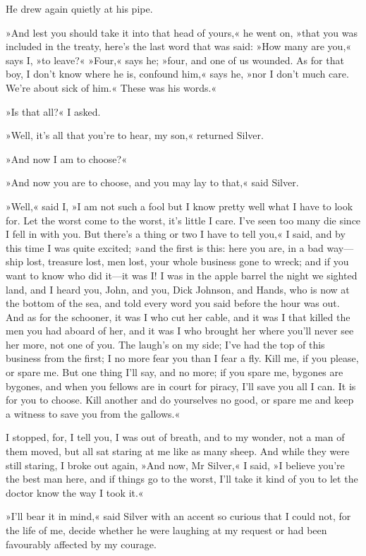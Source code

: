 He drew again quietly at his pipe.

»And lest you should take it into that head of yours,« he went on, »that you was included in the treaty, here's the last word that was said: »How many are you,« says I, »to leave?« »Four,« says he; »four, and one of us wounded. As for that boy, I don't know where he is, confound him,« says he, »nor I don't much care. We're about sick of him.« These was his words.«

»Is that all?« I asked.

»Well, it's all that you're to hear, my son,« returned Silver.

»And now I am to choose?«

»And now you are to choose, and you may lay to that,« said Silver.

»Well,« said I, »I am not such a fool but I know pretty well what I have to look for. Let the worst come to the worst, it's little I care. I've seen too many die since I fell in with you. But there's a thing or two I have to tell you,« I said, and by this time I was quite excited; »and the first is this: here you are, in a bad way—ship lost, treasure lost, men lost, your whole business gone to wreck; and if you want to know who did it—it was I! I was in the apple barrel the night we sighted land, and I heard you, John, and you, Dick Johnson, and Hands, who is now at the bottom of the sea, and told every word you said before the hour was out. And as for the schooner, it was I who cut her cable, and it was I that killed the men you had aboard of her, and it was I who brought her where you'll never see her more, not one of you. The laugh's on my side; I've had the top of this business from the first; I no more fear you than I fear a fly. Kill me, if you please, or spare me. But one thing I'll say, and no more; if you spare me, bygones are bygones, and when you fellows are in court for piracy, I'll save you all I can. It is for you to choose. Kill another and do yourselves no good, or spare me and keep a witness to save you from the gallows.«

I stopped, for, I tell you, I was out of breath, and to my wonder, not a man of them moved, but all sat staring at me like as many sheep. And while they were still staring, I broke out again, »And now, Mr Silver,« I said, »I believe you're the best man here, and if things go to the worst, I'll take it kind of you to let the doctor know the way I took it.«

»I'll bear it in mind,« said Silver with an accent so curious that I could not, for the life of me, decide whether he were laughing at my request or had been favourably affected by my courage.

